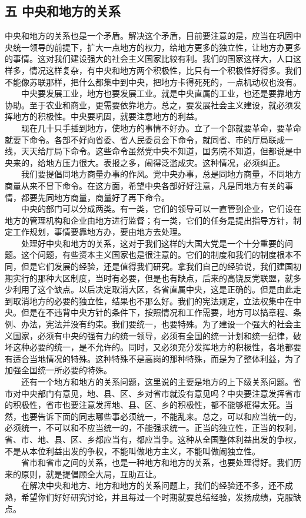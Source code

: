 \documentclass[cn,11pt,chinese]{elegantbook}
\def\myformat#1{\hfil\hfil #1}
\begin{document}
\subsection*{\myformat{五 中央和地方的关系}}
中央和地方的关系也是一个矛盾。解决这个矛盾，目前要注意的是，应当在巩固中央统一领导的前提下，扩大一点地方的权力，给地方更多的独立性，让地方办更多的事情。这对我们建设强大的社会主义国家比较有利。我们的国家这样大，人口这样多，情况这样复杂，有中央和地方两个积极性，比只有一个积极性好得多。我们不能像苏联那样，把什么都集中到中央，把地方卡得死死的，一点机动权也没有。\\
　　中央要发展工业，地方也要发展工业。就是中央直属的工业，也还是要靠地方协助。至于农业和商业，更需要依靠地方。总之，要发展社会主义建设，就必须发挥地方的积极性。中央要巩固，就要注意地方的利益。\\
　　现在几十只手插到地方，使地方的事情不好办。立了一个部就要革命，要革命就要下命令。各部不好向省委、省人民委员会下命令，就同省、市的厅局联成一线，天天给厅局下命令。这些命令虽然党中央不知道，国务院不知道，但都说是中央来的，给地方压力很大。表报之多，闹得泛滥成灾。这种情况，必须纠正。\\
　　我们要提倡同地方商量办事的作风。党中央办事，总是同地方商量，不同地方商量从来不冒下命令。在这方面，希望中央各部好好注意，凡是同地方有关的事情，都要先同地方商量，商量好了再下命令。\\
　　中央的部门可以分成两类。有一类，它们的领导可以一直管到企业，它们设在地方的管理机构和企业由地方进行监督；有一类，它们的任务是提出指导方针，制定工作规划，事情要靠地方办，要由地方去处理。\\
　　处理好中央和地方的关系，这对于我们这样的大国大党是一个十分重要的问题。这个问题，有些资本主义国家也是很注意的。它们的制度和我们的制度根本不同，但是它们发展的经验，还是值得我们研究。拿我们自己的经验说，我们建国初期实行的那种大区制度，当时有必要，但是也有缺点，后来的高饶反党联盟，就多少利用了这个缺点。以后决定取消大区，各省直属中央，这是正确的。但是由此走到取消地方的必要的独立性，结果也不那么好。我们的宪法规定，立法权集中在中央。但是在不违背中央方针的条件下，按照情况和工作需要，地方可以搞章程、条例、办法，宪法并没有约束。我们要统一，也要特殊。为了建设一个强大的社会主义国家，必须有中央的强有力的统一领导，必须有全国的统一计划和统一纪律，破坏这种必要的统一，是不允许的。同时，又必须充分发挥地方的积极性，各地都要有适合当地情况的特殊。这种特殊不是高岗的那种特殊，而是为了整体利益，为了加强全国统一所必要的特殊。\\
　　还有一个地方和地方的关系问题，这里说的主要是地方的上下级关系问题。省市对中央部门有意见，地、县、区、乡对省市就没有意见吗？中央要注意发挥省市的积极性，省市也要注意发挥地、县、区、乡的积极性，都不能够框得太死。当然，也要告诉下面的同志哪些事必须统一，不能乱来。总之，可以和应当统一的，必须统一，不可以和不应当统一的，不能强求统一。正当的独立性，正当的权利，省、市、地、县、区、乡都应当有，都应当争。这种从全国整体利益出发的争权，不是从本位利益出发的争权，不能叫做地方主义，不能叫做闹独立性。\\
　　省市和省市之间的关系，也是一种地方和地方的关系，也要处理得好。我们历来的原则，就是提倡顾全大局，互助互让。\\
　　在解决中央和地方、地方和地方的关系问题上，我们的经验还不多，还不成熟，希望你们好好研究讨论，并且每过一个时期就要总结经验，发扬成绩，克服缺点。\\
\end{document}
